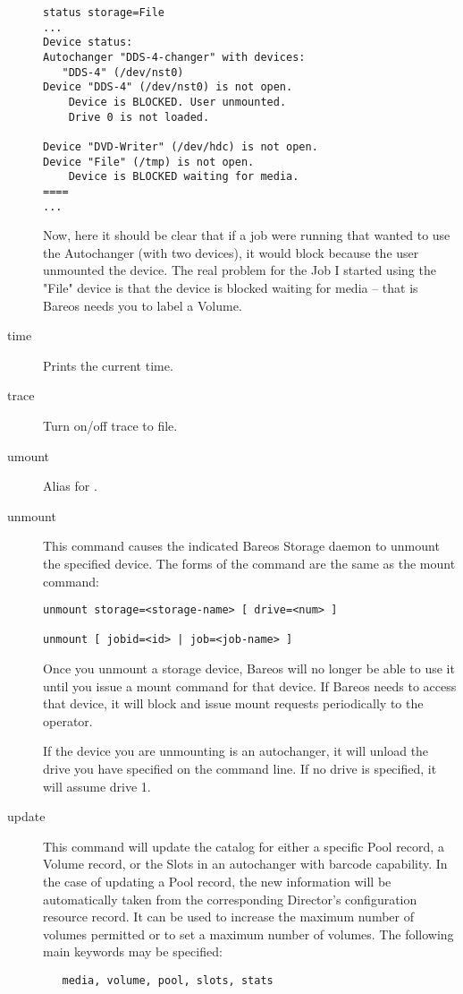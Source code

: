\begin{description}
\footnotesize
\begin{verbatim}
status storage=File
...
Device status:
Autochanger "DDS-4-changer" with devices:
   "DDS-4" (/dev/nst0)
Device "DDS-4" (/dev/nst0) is not open.
    Device is BLOCKED. User unmounted.
    Drive 0 is not loaded.

Device "DVD-Writer" (/dev/hdc) is not open.
Device "File" (/tmp) is not open.
    Device is BLOCKED waiting for media.
====
...
\end{verbatim}
\normalsize

Now, here it should be clear that if a job were running that wanted
to use the Autochanger (with two devices), it would block because
the user unmounted the device. The real problem for the Job I started
using the "File" device is that the device is blocked waiting for
media -- that is Bareos needs you to label a Volume.

\item [time]
   Prints the current time.

\item [trace]
   Turn on/off trace to file.

\item [umount]
   Alias for .

\item [unmount]
   This command causes the indicated Bareos Storage  daemon to unmount the
   specified device. The forms of the command  are the same as the mount command:
\footnotesize
\begin{verbatim}
unmount storage=<storage-name> [ drive=<num> ]

unmount [ jobid=<id> | job=<job-name> ]
\end{verbatim}
\normalsize

   Once you unmount a storage device, Bareos will no longer be able to use
   it until you issue a mount command for that device. If Bareos needs to
   access that device, it will block and issue mount requests periodically
   to the operator.

   If the device you are unmounting is an autochanger, it will unload
   the drive you have specified on the command line. If no drive is
   specified, it will assume drive 1.

\item [update]
   \label{UpdateCommand}
   This command will update the catalog for either a specific Pool record, a Volume
   record, or the Slots in an  autochanger with barcode capability. In the case
   of updating a  Pool record, the new information will be automatically taken
   from  the corresponding Director's configuration resource record. It  can be
   used to increase the maximum number of volumes permitted or  to set a maximum
   number of volumes. The following main  keywords may be specified:
\footnotesize
\begin{verbatim}
   media, volume, pool, slots, stats
\end{verbatim}
\normalsize


\end{description}
